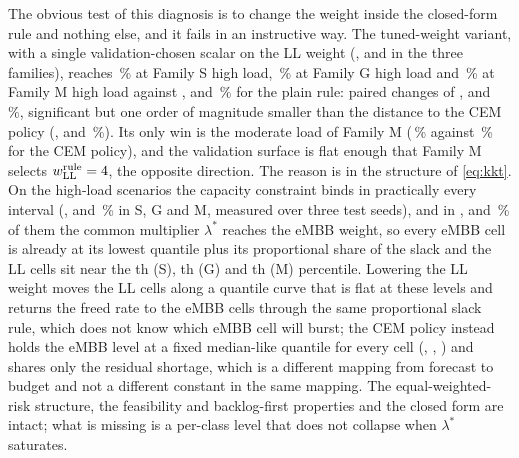 \documentclass[journal]{IEEEtran}
\begin{document}
The obvious test of this diagnosis is to change the weight inside the closed-form rule and nothing else, and it fails in an instructive way. The tuned-weight variant, with a single validation-chosen scalar on the LL weight (\xtwS{}, \xtwG{} and \xtwM{} in the three families), reaches \xmeanhighproposedtw{}\,\% at Family S high load, \xmeantgpphighproposedtw{}\,\% at Family G high load and \xmeanmmhighproposedtw{}\,\% at Family M high load against \xmeanhighproposed{}, \xmeantgpphighproposed{} and \xmeanmmhighproposed{}\,\% for the plain rule: paired changes of \xredhighproposedtw{}, \xredtgpphighproposedtw{} and \xredmmhighproposedtw{}\,\%, significant but one order of magnitude smaller than the distance to the CEM policy (\xmeanhighcempolicy{}, \xmeantgpphighcempolicy{} and \xmeanmmhighcempolicy{}\,\%). Its only win is the moderate load of Family M (\xmeanmmmoderateproposedtw{}\,\% against \xmeanmmmoderatecempolicy{}\,\% for the CEM policy), and the validation surface is flat enough that Family M selects $w^{\rm rule}_{\rm LL} = 4$, the opposite direction. The reason is in the structure of \eqref{eq:kkt}. On the high-load scenarios the capacity constraint binds in practically every interval (\xlamBindS{}, \xlamBindG{} and \xlamBindM{}\,\% in S, G and M, measured over three test seeds), and in \xlamFloorS{}, \xlamFloorG{} and \xlamFloorM{}\,\% of them the common multiplier $\lambda^\ast$ reaches the eMBB weight, so every eMBB cell is already at its lowest quantile plus its proportional share of the slack and the LL cells sit near the \xlamLLlevelS{}th (S), \xlamLLlevelG{}th (G) and \xlamLLlevelM{}th (M) percentile. Lowering the LL weight moves the LL cells along a quantile curve that is flat at these levels and returns the freed rate to the eMBB cells through the same proportional slack rule, which does not know which eMBB cell will burst; the CEM policy instead holds the eMBB level at a fixed median-like quantile for every cell (\xcemS{}, \xcemG{}, \xcemM{}) and shares only the residual shortage, which is a different mapping from forecast to budget and not a different constant in the same mapping. The equal-weighted-risk structure, the feasibility and backlog-first properties and the closed form are intact; what is missing is a per-class level that does not collapse when $\lambda^\ast$ saturates.
\end{document}
